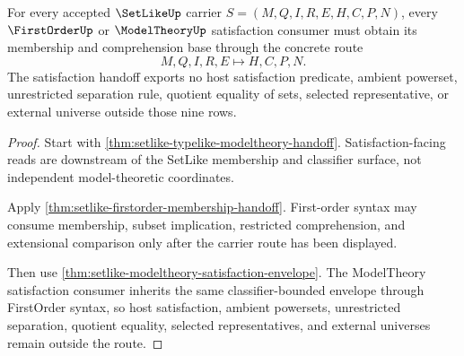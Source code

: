 \begin{theorem}
\label{thm:setlike-satisfaction-handoff-obligation}
For every accepted $\SetLikeUp$ carrier $S=(M,Q,I,R,E,H,C,P,N)$, every $\FirstOrderUp$ or $\ModelTheoryUp$ satisfaction consumer must obtain its membership and comprehension base through the concrete route
$$
M,Q,I,R,E \longmapsto H,C,P,N .
$$
The satisfaction handoff exports no host satisfaction predicate, ambient powerset, unrestricted separation rule, quotient equality of sets, selected representative, or external universe outside those nine rows.
\end{theorem}
\begin{proof}
Start with \autoref{thm:setlike-typelike-modeltheory-handoff}. Satisfaction-facing reads are downstream of the SetLike membership and classifier surface, not independent model-theoretic coordinates.

Apply \autoref{thm:setlike-firstorder-membership-handoff}. First-order syntax may consume membership, subset implication, restricted comprehension, and extensional comparison only after the carrier route has been displayed.

Then use \autoref{thm:setlike-modeltheory-satisfaction-envelope}. The ModelTheory satisfaction consumer inherits the same classifier-bounded envelope through FirstOrder syntax, so host satisfaction, ambient powersets, unrestricted separation, quotient equality, selected representatives, and external universes remain outside the route.
\end{proof}


